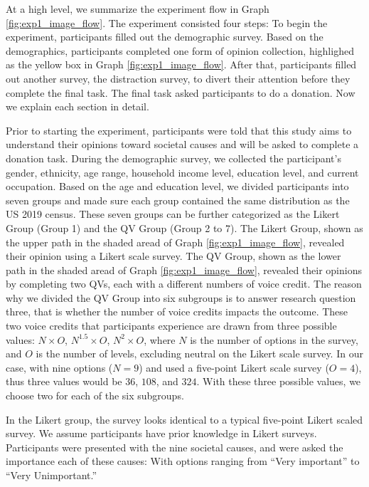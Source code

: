 At a high level, 
we summarize the experiment flow 
in Graph \ref{fig:exp1_image_flow}.
The experiment consisted four steps:
To begin the experiment, 
participants filled out the demographic survey.
Based on the demographics,
participants completed one form of opinion collection,
highlighed as the yellow box
in Graph \ref{fig:exp1_image_flow}.
After that, 
participants filled out another survey,
the distraction survey,
to divert their attention before they complete the final task.
The final task asked participants to do a donation.
Now we explain each section in detail.

Prior to starting the experiment,
participants were told that 
this study aims to understand their opinions 
toward societal causes and will be asked to complete a donation task.
During the demographic survey, 
we collected the participant's gender, ethnicity, age range, household income level, 
education level, and current occupation.
Based on the age and education level,
we divided participants into seven groups
and made sure each group contained the same distribution
as the US 2019 census.
These seven groups can be further categorized as
the Likert Group (Group 1) and the QV Group (Group 2 to 7).
The Likert Group, shown as the upper path in the shaded aread of Graph \ref{fig:exp1_image_flow}, 
revealed their opinion using a Likert scale survey.
The QV Group, shown as the lower path in the shaded aread of Graph \ref{fig:exp1_image_flow}, 
revealed their opinions by completing two QVs, each with a different numbers of voice credit.
The reason why we divided the QV Group into six subgroups
is to answer research question three, 
that is whether the number of voice credits impacts the outcome.
These two voice credits that participants experience 
are drawn from three possible values: $N \times O$, $N^1.5 \times O$, $N^2 \times O$, 
where $N$ is the number of options in the survey, 
and $O$ is the number of levels, 
excluding neutral on the Likert scale survey. %
In our case, with nine options ($N=9$) and
used a five-point Likert scale survey ($O=4$), 
thus three values would be $36$, $108$, and $324$.
With these three possible values, 
we choose two for each of the six subgroups.

In the Likert group, 
the survey looks identical to a typical five-point Likert scaled survey.
We assume participants have prior knowledge in Likert surveys.
Participants were presented with the nine societal causes, 
and were asked the importance each of these causes: 
With options ranging from ``Very important'' to ``Very Unimportant.''

